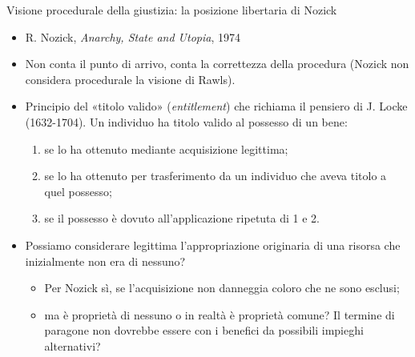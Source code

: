 \documentclass[aspectratio=64,12pt]{beamer}
\begin{document}
\begin{frame}{Visione procedurale della giustizia: la posizione libertaria di Nozick}
\begin{itemize}
\item R. Nozick, \emph{Anarchy, State and Utopia}, 1974
\item Non conta il punto di arrivo, conta la correttezza della procedura (Nozick non considera procedurale la visione di Rawls).
\item Principio del «titolo valido» (\emph{entitlement}) che richiama il pensiero di
J. Locke (1632-1704). Un individuo ha titolo valido al possesso di un bene:
\begin{enumerate}
\item se lo ha ottenuto mediante acquisizione legittima;
\item se lo ha ottenuto per trasferimento da un individuo che aveva titolo a
quel possesso;
\item se il possesso è dovuto all'applicazione ripetuta di 1 e 2.
\end{enumerate}
\item Possiamo considerare legittima l'appropriazione originaria di una risorsa che
inizialmente non era di nessuno?
\begin{itemize}
\item Per Nozick sì, se l'acquisizione non danneggia coloro che ne sono
esclusi;
\item ma è proprietà di nessuno o in realtà è proprietà comune? Il termine di
paragone non dovrebbe essere con i benefici da possibili impieghi alternativi?
\end{itemize}
\end{itemize}
\end{frame}
\end{document}
